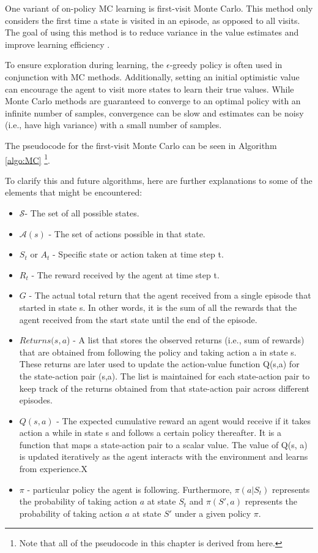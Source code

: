 One variant of on-policy MC learning is first-visit Monte Carlo. This method only considers the first time a state is visited in an episode, as opposed to all visits. The goal of using this method is to reduce variance in the value estimates and improve learning efficiency  \citep{RLSuttonBarto}. 

To ensure exploration during learning, the $\epsilon$-greedy policy is often used in conjunction with MC methods. Additionally, setting an initial optimistic value can encourage the agent to visit more states to learn their true values. While Monte Carlo methods are guaranteed to converge to an optimal policy with an infinite number of samples, convergence can be slow and estimates can be noisy (i.e., have high variance) with a small number of samples.

The pseudocode for the first-visit Monte Carlo can be seen in Algorithm \ref{algo:MC}  \citep{RLSuttonBarto}\footnote{Note that all of the pseudocode in this chapter is derived from here.}.

To clarify this and future algorithms, here are further explanations to some of the elements that might be encountered:
\begin{itemize}
\item $\mathcal{S}$- The set of all possible states.
\item $\mathcal{A}(s)$ - The set of actions possible in that state.
\item $S_t$ or $A_t$ - Specific state or action taken at time step t.
\item $R_{t}$ -  The reward received by the agent at time step t.
\item $G$ - The actual total return that the agent received from a single episode that started in state s. In other words, it is the sum of all the rewards that the agent received from the start state until the end of the episode.
\item $Returns(s,a$) - A list that stores the observed returns (i.e., sum of rewards) that are obtained from following the policy and taking action a in state s. These returns are later used to update the action-value function Q(s,a) for the state-action pair (s,a). The list is maintained for each state-action pair to keep track of the returns obtained from that state-action pair across different episodes.
\item $Q(s, a)$ -  The expected cumulative reward an agent would receive if it takes action a while in state s and follows a certain policy thereafter. It is a function that maps a state-action pair to a scalar value. The value of Q(s, a) is updated iteratively as the agent interacts with the environment and learns from experience.X
\item  $\pi$ - particular policy the agent is following. Furthermore, $\pi(a|S_t)$ represents the probability of taking action $a$ at state $S_t$ and $\pi(S',a)$ represents the probability of taking action $a$ at state $S'$ under a given policy $\pi$.
\end{itemize}

